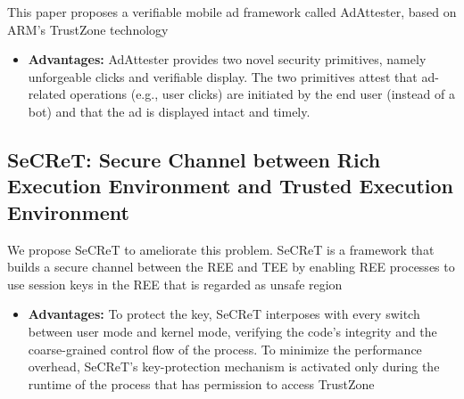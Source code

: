 \documentclass[conference]{IEEEtran}
\begin{document}
This paper proposes a verifiable mobile ad framework called AdAttester, based on ARM’s TrustZone technology
\begin{itemize}
    \item \textbf{Advantages:} AdAttester provides two novel security primitives, namely unforgeable clicks and verifiable display. The two primitives attest that ad-related operations (e.g., user clicks) are initiated by the end user (instead of a bot) and that the ad is displayed intact and timely.
\end{itemize}


\subsection{SeCReT: Secure Channel between Rich Execution Environment and Trusted Execution Environment}

We propose SeCReT to ameliorate this problem. SeCReT is a framework that builds a secure channel between the REE and TEE by enabling REE processes to use session keys in the REE that is regarded as unsafe region
\begin{itemize}
    \item \textbf{Advantages:} To protect the key, SeCReT interposes with every switch between user mode and kernel mode, verifying the code’s integrity and the coarse-grained control flow of the process. To minimize the performance overhead, SeCReT’s key-protection mechanism is activated only during the runtime of the process that has permission to access TrustZone
\end{itemize}



\end{document}
